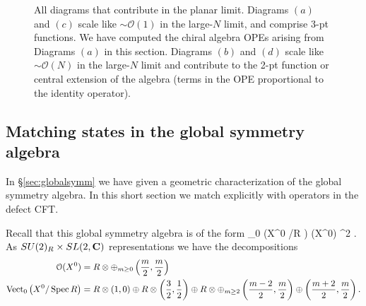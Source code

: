 \documentclass[../main.tex]{subfiles}
\begin{document}
\begin{figure}
\begin{tikzpicture}[scale={0.75}]
	\end{tikzpicture}
	\caption{All diagrams that contribute in the planar limit.  Diagrams $(a)$ and $(c)$ scale like $\sim \mathcal{O}(1)$ in the large-$N$ limit, and comprise 3-pt functions. We have computed the chiral algebra OPEs arising from Diagrams $(a)$ in this section. Diagrams $(b)$ and $(d)$ scale like $\sim \mathcal{O}(N)$ in the  large-$N$ limit and contribute to the 2-pt function or central extension of the algebra (terms in the OPE proportional to the identity operator). \label{fig:alldiagramsplanar}}
\end{figure}


\subsection{Matching states in the global symmetry algebra}

In \S \ref{sec:globalsymm} we have given a geometric characterization of the global symmetry algebra.
In this short section we match explicitly with operators in the defect CFT.

Recall that this global symmetry algebra is of the form
\beqn
{}_0 \left(X^0 \slash \Spec R \right) \oplus \cO(X^0) \otimes \Pi \C^2 .
\eeqn
As $SU(2)_R \times SL(2,\C)$ representations we have the decompositions
\begin{align*}
\cO(X^0) & = R \otimes \oplus_{m \geq 0} \left(\frac{m}{2}, \frac{m}{2} \right) \\
\op{Vect}_0 \left(X^0 \slash \Spec R \right) & = R \otimes \left(1,0\right) \oplus R \otimes \left(\frac32, \frac12\right) \oplus R \otimes \oplus_{m \geq 2} \left(\frac{m-2}{2},\frac{m}2\right) \oplus \left(\frac{m+2}{2}, \frac{m}{2}\right) .
\end{align*}
\end{document}
